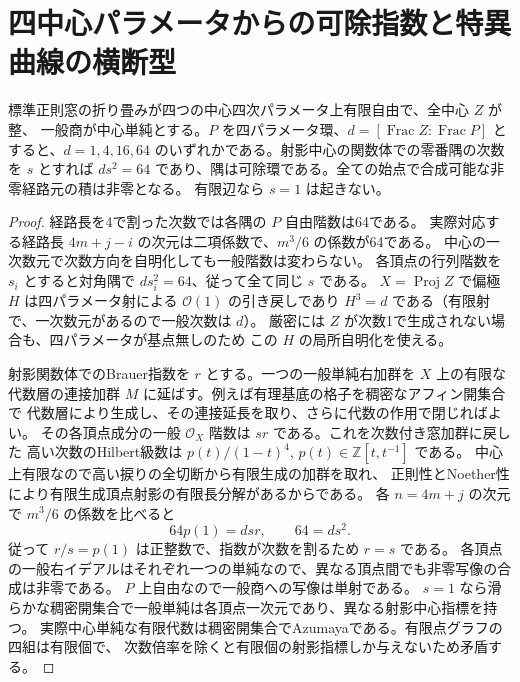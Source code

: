 \section{四中心パラメータからの可除指数と特異曲線の横断型}
\label{sec:central-cut-index-and-transverse-type}
\begin{theorem}\label{thm:central-cut-division-index}
標準正則窓の折り畳みが四つの中心四次パラメータ上有限自由で、全中心 $Z$ が整、
一般商が中心単純とする。$P$ を四パラメータ環、$d=[\operatorname{Frac}Z:\operatorname{Frac}P]$
とすると、$d=1,4,16,64$ のいずれかである。射影中心の関数体での零番隅の次数を $s$ とすれば
$d s^2=64$ であり、隅は可除環である。全ての始点で合成可能な非零経路元の積は非零となる。
有限辺なら $s=1$ は起きない。
\end{theorem}
\begin{proof}
経路長を4で割った次数では各隅の $P$ 自由階数は64である。
実際対応する経路長 $4m+j-i$ の次元は二項係数で、$m^3/6$ の係数が64である。
中心の一次数元で次数方向を自明化しても一般階数は変わらない。
各頂点の行列階数を $s_i$ とすると対角隅で $d s_i^2=64$、従って全て同じ $s$ である。
$X=\operatorname{Proj}Z$ で偏極 $H$ は四パラメータ射による $\mathcal O(1)$ の引き戻しであり
$H^3=d$ である（有限射で、一次数元があるので一般次数は $d$）。
厳密には $Z$ が次数1で生成されない場合も、四パラメータが基点無しのため
この $H$ の局所自明化を使える。

射影関数体でのBrauer指数を $r$ とする。一つの一般単純右加群を
$X$ 上の有限な代数層の連接加群 $M$ に延ばす。例えば有理基底の格子を稠密なアフィン開集合で
代数層により生成し、その連接延長を取り、さらに代数の作用で閉じればよい。
その各頂点成分の一般 $\mathcal O_X$ 階数は $sr$ である。これを次数付き窓加群に戻した
高い次数のHilbert級数は $p(t)/(1-t)^4$, $p(t)\in\mathbb Z[t,t^{-1}]$ である。
中心上有限なので高い捩りの全切断から有限生成の加群を取れ、
正則性とNoether性により有限生成頂点射影の有限長分解があるからである。
各 $n=4m+j$ の次元で $m^3/6$ の係数を比べると
\[
             64 p(1)=d s r,\qquad 64=d s^2 .
\]
従って $r/s=p(1)$ は正整数で、指数が次数を割るため $r=s$ である。
各頂点の一般右イデアルはそれぞれ一つの単純なので、異なる頂点間でも非零写像の合成は非零である。
$P$ 上自由なので一般商への写像は単射である。
$s=1$ なら滑らかな稠密開集合で一般単純は各頂点一次元であり、異なる射影中心指標を持つ。
実際中心単純な有限代数は稠密開集合でAzumayaである。有限点グラフの四組は有限個で、
次数倍率を除くと有限個の射影指標しか与えないため矛盾する。
\end{proof}

